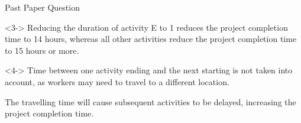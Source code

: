 \documentclass[8pt]{beamer}
\begin{document}
\begin{frame}[allowframebreaks]{Past Paper Question}
\begin{solution}
\begin{center}
			
		\end{center}

\end{solution}

\begin{solution}<3->
	Reducing the duration of activity E to 1 reduces the project completion time to 14 hours, whereas all other activities reduce the project completion time to 15 hours or more.
\end{solution}

\begin{solution}<4->
	Time between one activity ending and the next starting is not taken into account, as workers may need to travel to a different location.

	The travelling time will cause subsequent activities to be delayed, increasing the project completion time.
\end{solution}

\end{frame}
\end{document}
